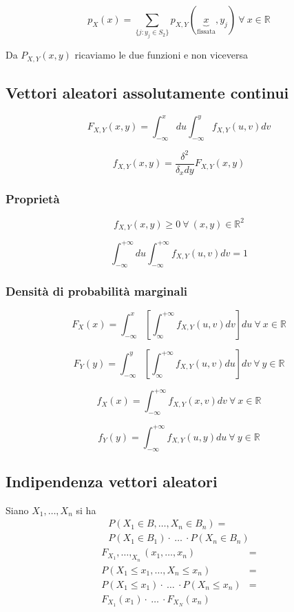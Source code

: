 \begin{multicols*}{2}
$$
p_X(x) = \sum_{\{j: y_j \in S_2\}}p_{X,Y}(\underbrace{x}_{\text{fissata}}, y_j) \ \forall \ x \in \mathbb{R}
$$

Da $P_{X,Y}(x,y)$ ricaviamo le due funzioni e non viceversa

\subsection*{Vettori aleatori assolutamente continui}
$$
F_{X,Y}(x,y) = \int_{-\infty}^{x}du \int_{-\infty}^{y} f_{X,Y}(u,v) dv
$$

$$
f_{X,Y}(x,y) = \frac{\delta^2}{\delta_x dy} F_{X,Y}(x,y)
$$

\subsubsection*{Proprietà}
$$
f_{X,Y}(x,y) \ge 0 \ \forall \ (x,y) \in \mathbb{R}^2
$$

$$
\int_{-\infty}^{+\infty}du \int_{-\infty}^{+\infty} f_{X,Y}(u,v) dv = 1
$$

\subsubsection*{Densità di probabilità marginali}
$$
F_X(x) = \int_{-\infty}^{x}\left[\int_{\infty}^{+\infty} f_{X,Y}(u,v) dv\right] du \ \forall \ x \in \mathbb{R}
$$

$$
F_Y(y) = \int_{-\infty}^{y}\left[\int_{\infty}^{+\infty} f_{X,Y}(u,v) du\right] dv \ \forall \ y \in \mathbb{R}
$$

$$
f_X(x) = \int_{-\infty}^{+\infty} f_{X,Y}(x,v) dv \ \forall \ x \in \mathbb{R}
$$

$$
f_Y(y) = \int_{-\infty}^{+\infty} f_{X,Y}(u,y) du \ \forall \ y \in \mathbb{R}
$$

\subsection*{Indipendenza vettori aleatori}
Siano $X_1,\dots,X_n$ si ha
\begin{align*}
P(X_1 \in B,\dots, X_n \in B_n) =
\\P(X_1 \in B_1) \cdot \ \dots \ \cdot P(X_n \in B_n)
\end{align*}
\begin{align*}
F_{X_1}, \dots, _{X_n}(x_1, \dots, x_n) &=
\\P(X_1 \le x_1, \dots, X_n \le x_n) &= 
\\P(X_1 \le x_1)\cdot \ \dots \ \cdot P(X_n \le x_n) &= 
\\F_{X_1}(x_1) \cdot \ \dots \ \cdot F_{X_N}(x_n)
\end{align*}


\end{multicols*}
